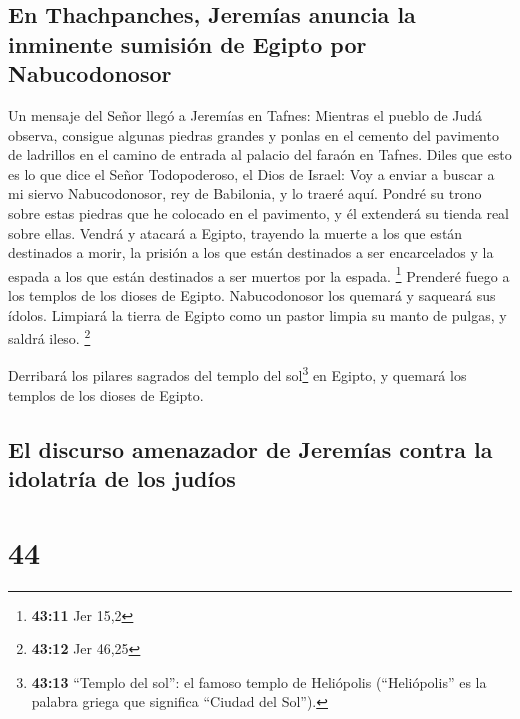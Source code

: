 \hypertarget{en-thachpanches-jeremuxedas-anuncia-la-inminente-sumisiuxf3n-de-egipto-por-nabucodonosor}{%
\subsection{En Thachpanches, Jeremías anuncia la inminente sumisión de
Egipto por
Nabucodonosor}\label{en-thachpanches-jeremuxedas-anuncia-la-inminente-sumisiuxf3n-de-egipto-por-nabucodonosor}}

 Un mensaje del Señor llegó a Jeremías en Tafnes:
 Mientras el pueblo de Judá observa, consigue algunas
piedras grandes y ponlas en el cemento del pavimento de ladrillos en el
camino de entrada al palacio del faraón en Tafnes.  Diles
que esto es lo que dice el Señor Todopoderoso, el Dios de Israel: Voy a
enviar a buscar a mi siervo Nabucodonosor, rey de Babilonia, y lo traeré
aquí. Pondré su trono sobre estas piedras que he colocado en el
pavimento, y él extenderá su tienda real sobre ellas. 
Vendrá y atacará a Egipto, trayendo la muerte a los que están destinados
a morir, la prisión a los que están destinados a ser encarcelados y la
espada a los que están destinados a ser muertos por la espada.
\footnote{\textbf{43:11} Jer 15,2}  Prenderé fuego a los
templos de los dioses de Egipto. Nabucodonosor los quemará y saqueará
sus ídolos. Limpiará la tierra de Egipto como un pastor limpia su manto
de pulgas, y saldrá ileso. \footnote{\textbf{43:12} Jer 46,25}

 Derribará los pilares sagrados del templo del
sol\footnote{\textbf{43:13} ``Templo del sol'': el famoso templo de
  Heliópolis (``Heliópolis'' es la palabra griega que significa ``Ciudad
  del Sol'').} en Egipto, y quemará los templos de los dioses de Egipto.

\hypertarget{el-discurso-amenazador-de-jeremuxedas-contra-la-idolatruxeda-de-los-juduxedos}{%
\subsection{El discurso amenazador de Jeremías contra la idolatría de
los
judíos}\label{el-discurso-amenazador-de-jeremuxedas-contra-la-idolatruxeda-de-los-juduxedos}}

\hypertarget{section-43}{%
\section{44}\label{section-43}}

